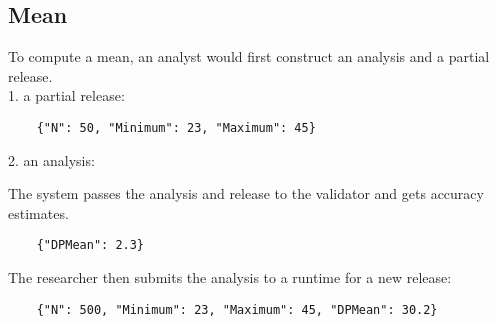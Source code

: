 \documentclass[11pt]{article}
\begin{document}
\subsection{Mean}
To compute a mean, an analyst would first construct an analysis and a partial release. \\
1. a partial release:
\begin{verbatim}
    {"N": 50, "Minimum": 23, "Maximum": 45}
\end{verbatim}
2. an analysis:
\begin {center}
\end{center}
The system passes the analysis and release to the validator and gets accuracy estimates.
\begin{verbatim}
    {"DPMean": 2.3}
\end{verbatim}
The researcher then submits the analysis to a runtime for a new release:
\begin{verbatim}
    {"N": 500, "Minimum": 23, "Maximum": 45, "DPMean": 30.2}
\end{verbatim}
\end{document}
